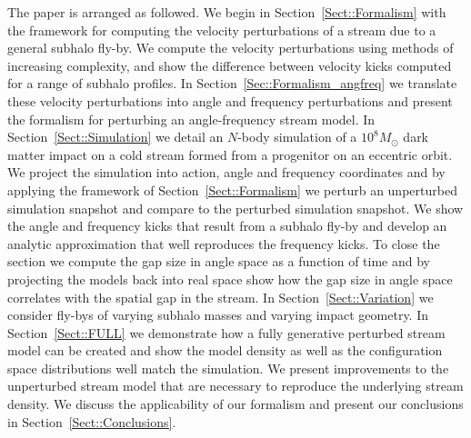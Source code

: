 \documentclass[useAMS,usenatbib,fleqn,a4paper]{mn2e}
\begin{document}
The paper is arranged as followed. We begin in Section~\ref{Sect::Formalism} with the framework for computing the velocity perturbations of a stream due to a general subhalo fly-by. We compute the velocity perturbations using methods of increasing complexity, and show the difference between velocity kicks computed for a range of subhalo profiles. In Section~\ref{Sec::Formalism_angfreq} we translate these velocity perturbations into angle and frequency perturbations and present the formalism for perturbing an angle-frequency stream model. In Section~\ref{Sect::Simulation} we detail an $N$-body simulation of a $10^8M_\odot$ dark matter impact on a cold stream formed from a progenitor on an eccentric orbit. We project the simulation into action, angle and frequency coordinates and by applying the framework of Section~\ref{Sect::Formalism} we perturb an unperturbed simulation snapshot and compare to the perturbed simulation snapshot. We show the angle and frequency kicks that result from a subhalo fly-by and develop an analytic approximation that well reproduces the frequency kicks. To close the section we compute the gap size in angle space as a function of time and by projecting the models back into real space show how the gap size in angle space correlates with the spatial gap in the stream.  In Section~\ref{Sect::Variation} we consider fly-bys of varying subhalo masses and varying impact geometry. In Section~\ref{Sect::FULL} we demonstrate how a fully generative perturbed stream model can be created and show the model density as well as the configuration space distributions well match the simulation. We present improvements to the unperturbed stream model that are necessary to reproduce the underlying stream density. We discuss the applicability of our formalism and present our conclusions in Section~\ref{Sect::Conclusions}.
\end{document}
